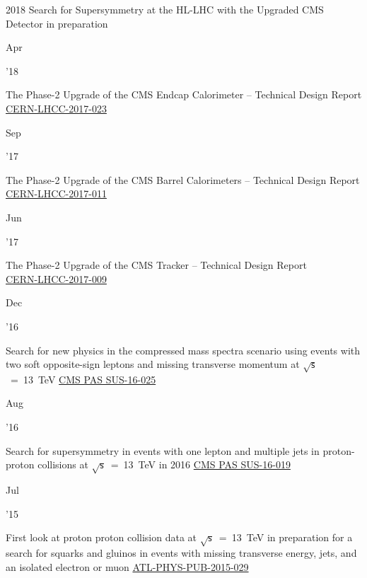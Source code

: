 \documentclass[]{cv} %
\begin{document}
\begin{entrylist}

  \entry
  {2018}
  {Search for Supersymmetry at the HL-LHC with the Upgraded CMS Detector}
  {in preparation}
  {\vspace*{\spacingPubs}}

  \entry
  {\parbox[t]{\parboxWidthOne}{Apr}\parbox[t]{\parboxWidthTwo}{\hfill '18}}
  {The Phase-2 Upgrade of the CMS Endcap Calorimeter -- Technical Design Report}
  {\href{https://cds.cern.ch/record/2293646}{CERN-LHCC-2017-023}}
  {\vspace*{\spacingPubs}}

  \entry
  {\parbox[t]{\parboxWidthOne}{Sep}\parbox[t]{\parboxWidthTwo}{\hfill '17}}
  {The Phase-2 Upgrade of the CMS Barrel Calorimeters -- Technical Design Report}
  {\href{https://cds.cern.ch/record/2283187}{CERN-LHCC-2017-011}}
  {\vspace*{\spacingPubs}}

  \entry
  {\parbox[t]{\parboxWidthOne}{Jun}\parbox[t]{\parboxWidthTwo}{\hfill '17}}
  {The Phase-2 Upgrade of the CMS Tracker -- Technical Design Report\\}
  {\href{https://cds.cern.ch/record/2272264}{CERN-LHCC-2017-009}}
  {\vspace*{\spacingPubs}}

  \entry
  {\parbox[t]{\parboxWidthOne}{Dec}\parbox[t]{\parboxWidthTwo}{\hfill '16}}
  {Search for new physics in the compressed mass spectra scenario using events with two soft opposite-sign leptons and missing transverse momentum at $\sqrt{\mathsf{s}}$~=~13~TeV}
  {\href{https://cds.cern.ch/record/2205866}{CMS PAS SUS-16-025}}
  {\vspace*{\spacingPubs}}

  \entry
  {\parbox[t]{\parboxWidthOne}{Aug}\parbox[t]{\parboxWidthTwo}{\hfill '16}}
  {Search for supersymmetry in events with one lepton and multiple jets in proton-proton collisions at $\sqrt{\mathsf{s}}$~=~13~TeV in 2016}
  {\href{https://cds.cern.ch/record/2204932}{CMS PAS SUS-16-019}}
  {\vspace*{\spacingPubs}}

  \entry
  {\parbox[t]{\parboxWidthOne}{Jul}\parbox[t]{\parboxWidthTwo}{\hfill '15}}
  {First look at proton proton collision data at $\sqrt{\mathsf{s}}$~=~13~TeV in
  preparation for a search for squarks and gluinos in events with missing
  transverse energy, jets, and an isolated electron or muon}
  {\href{https://cds.cern.ch/record/2037906}{ATL-PHYS-PUB-2015-029}}
  {\vspace*{\spacingPubs}}

\end{entrylist}
\end{document}
